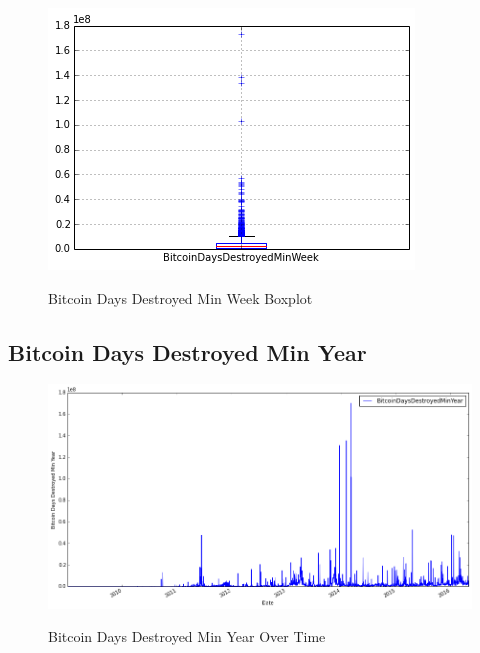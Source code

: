 \begin{figure}[bth]
  \myfloatalign
  {\includegraphics[width=1\linewidth]
    {gfx/bitcoin-days-destroyed-min-week-boxplot}}
  \caption{Bitcoin Days Destroyed Min Week Boxplot}
  \label{fig:bitcoin-days-destroyed-min-week-boxplot}
\end{figure}

\clearpage

\subsection{Bitcoin Days Destroyed Min Year}
\label{sec:bitcoin-days-destroyed-min-year}

\begin{figure}[bth]
  \myfloatalign
  {\includegraphics[width=1\linewidth]
    {gfx/bitcoin-days-destroyed-min-year-over-time}}
  \caption{Bitcoin Days Destroyed Min Year Over Time}
  \label{fig:bitcoin-days-destroyed-min-year-over-time}
\end{figure}

